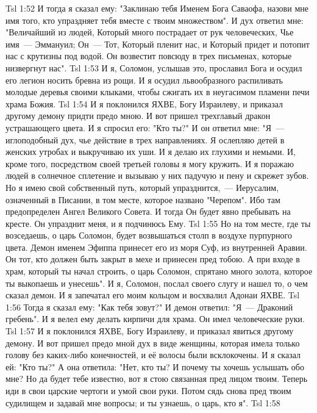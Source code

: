 \vs Tsl 1:52 
И тогда я сказал ему: "Заклинаю тебя Именем Бога Саваофа, назови мне имя того, кто упраздняет тебя вместе с твоим множеством". И дух ответил мне: "Величайший из людей, Который много пострадает от рук человеческих, Чье имя~--- Эммануил; Он~--- Тот, Который пленит нас, и Который придет и потопит нас с крутизны под водой. Он возвестит повсюду в трех письменах, которые низвергнут нас".
\vs Tsl 1:53 
И я, Соломон, услышав это, прославил Бога и осудил его легион носить бревна из рощи. И я осудил львообразного распиливать молодые деревья своими клыками, чтобы сжигать их в неугасимом пламени печи храма Божия.
\vs Tsl 1:54 
И я поклонился ЯХВЕ, Богу Израилеву, и приказал другому демону придти предо мною. И вот пришел трехглавый дракон устрашающего цвета. И я спросил его: "Кто ты?" И он ответил мне: "Я~--- иглоподобный дух, чье действие в трех направлениях. Я ослепляю детей в женских утробах и выкручиваю их уши. И я делаю их глухими и немыми. И, кроме того, посредством своей третьей головы я могу кружить. И я поражаю людей в солнечное сплетение и вызываю у них падучую и пену и скрежет зубов. Но я имею свой собственный путь, который упразднится,~--- Иерусалим, означенный в Писании, в том месте, которое названо "Черепом". Ибо там предопределен Ангел Великого Совета. И тогда Он будет явно пребывать на кресте. Он упразднит меня, и я подчинюсь Ему.
\vs Tsl 1:55 
Но на том месте, где ты возседаешь, о царь Соломон, будет возвышаться столп в воздухе пурпурного цвета. Демон именем Эфиппа принесет его из моря Суф, из внутренней Аравии. Он тот, кто должен быть закрыт в мехе и принесен пред тобою. А при входе в храм, который ты начал строить, о царь Соломон, спрятано много золота, которое ты выкопаешь и унесешь". И я, Соломон, послал своего слугу и нашел то, о чем сказал демон. И я запечатал его моим кольцом и восхвалил Адонаи ЯХВЕ.
\vs Tsl 1:56 
Тогда я сказал ему: "Как тебя зовут?" И демон ответил: "Я~--- Драконий гребень". И я велел ему делать кирпичи для храма. Он имел человеческие руки.
\vs Tsl 1:57 
И я поклонился ЯХВЕ, Богу Израилеву, и приказал явиться другому демону. И вот пришел предо мной дух в виде женщины, которая имела только голову без каких-либо конечностей, и её волосы были всклокочены. И я сказал ей: "Кто ты?" А она ответила: "Нет, кто ты? И почему ты хочешь услышать обо мне? Но да будет тебе известно, вот я стою связанная пред лицом твоим. Теперь иди в свои царские чертоги и умой свои руки. Потом сядь снова пред твоим судилищем и задавай мне вопросы; и ты узнаешь, о царь, кто я".
\vs Tsl 1:58 
